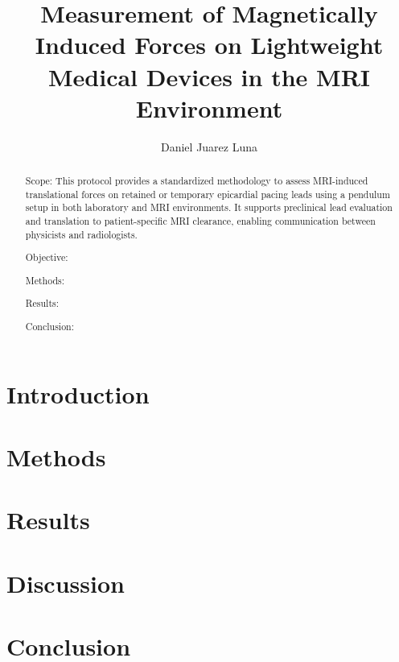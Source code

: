 \documentclass[aps,prl,preprint,superscriptaddress]{revtex4-2}
\begin{document}
	
	\title{Measurement of Magnetically Induced Forces on Lightweight Medical Devices in the MRI Environment}
	
	\author{Daniel Juarez Luna}



\begin{abstract}
Scope: 	This protocol provides a standardized methodology to assess MRI-induced translational forces on retained or temporary epicardial pacing leads using a pendulum setup in both laboratory and MRI environments. It supports preclinical lead evaluation and translation to patient-specific MRI clearance, enabling communication between physicists and radiologists.
	
Objective: 

Methods: 

Results: 

Conclusion: 
\end{abstract}



\maketitle
\section{Introduction}


\section{Methods}
%


\section{Results}

\section{Discussion}




\section{Conclusion}



\end{document}
